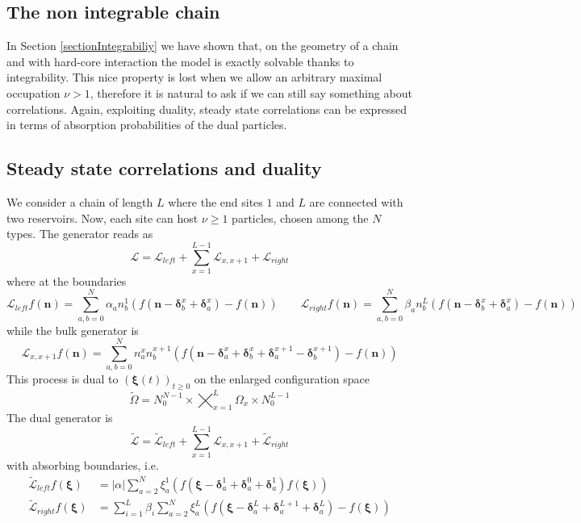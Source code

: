 \documentclass[10pt]{article}
\numberwithin{equation}{section}
\numberwithin{equation}{subsection}
\begin{document}
\subsection{The non integrable chain}
In Section \ref{sectionIntegrabiliy} we have shown that, on the geometry of a chain and with hard-core interaction the model is exactly solvable thanks to integrability. This nice property is lost when we allow an arbitrary maximal occupation $\nu>1$, therefore it is natural to ask if we can still say something about correlations. Again, exploiting duality, steady state correlations can be expressed in terms of absorption probabilities of the dual particles.
\subsection{Steady state correlations and duality}
We consider a chain of length $L$ where the end sites $1$ and $L$ are connected with two reservoirs. Now, each site can host $\nu\geq 1$ particles, chosen among the $N$ types. The generator reads as
\begin{equation}
	\mathcal{L}=\mathcal{L}_{left}+\sum_{x=1}^{L-1}\mathcal{L}_{x,x+1}+\mathcal{L}_{right}
\end{equation} 
where at the boundaries 
\begin{equation}
	\mathcal{L}_{left}f(\bm{n})=\sum_{a,b=0}^{N}\alpha_{a}n_{b}^{1}\left(f(\bm{n}-\bm{\delta}_{b}^{x}+\bm{\delta}_{a}^{x})-f(\bm{n})\right)\qquad \mathcal{L}_{right}f(\bm{n})=\sum_{a,b=0}^{N}\beta_{a}n_{b}^{L}\left(f(\bm{n}-\bm{\delta}_{b}^{x}+\bm{\delta}_{a}^{x})-f(\bm{n})\right)
\end{equation}
while the bulk generator is 
\begin{equation}
 \mathcal{L}_{x,x+1}f(\bm{n})=\sum_{a,b=0}^{N}n_{a}^{x}n_{b}^{x+1}\left(f(\bm{n}-\bm{\delta}_{a}^{x}+\bm{\delta}_{b}^{x}+\bm{\delta}_{a}^{x+1}-\bm{\delta}_{b}^{x+1})-f(\bm{n})\right)
\end{equation}
This process is dual to $(\bm{\xi}(t))_{t\geq0} $ on the enlarged configuration space
 \begin{equation}	
	\widetilde{\Omega}=N_{0}^{N-1}\times\bigtimes_{x=1}^{L} \Omega_{x}\times N_{0}^{L-1}
\end{equation}
The dual generator is 
\begin{equation}
	\widetilde{\mathcal{L}}=\widetilde{\mathcal{L}}_{left}+\sum_{x=1}^{L-1}\mathcal{L}_{x,x+1}+\widetilde{\mathcal{L}}_{right}
\end{equation} 
with absorbing boundaries, i.e. 
\begin{equation}
	\begin{split}
		\widetilde{\mathcal{L}}_{left}f(\bm{\xi})&=|\alpha|\sum_{a=2}^{N}\xi_{a}^{1}\left(f(\bm{\xi}-\bm{\delta}_{a}^{1}+\bm{\delta}_{a}^{0}+\bm{\delta}_{a}^{1})f(\bm{\xi})\right)\\\widetilde{\mathcal{L}}_{right}f(\bm{\xi})&=\sum_{i=1}^{L}\beta_{i}\sum_{a=2}^{N}\xi_{a}^{L}\left(f(\bm{\xi}-\bm{\delta}_{a}^{L}+\bm{\delta}_{a}^{L+1}+\bm{\delta}_{a}^{L})-f(\bm{\xi})\right)
	\end{split}
\end{equation}
\end{document}
